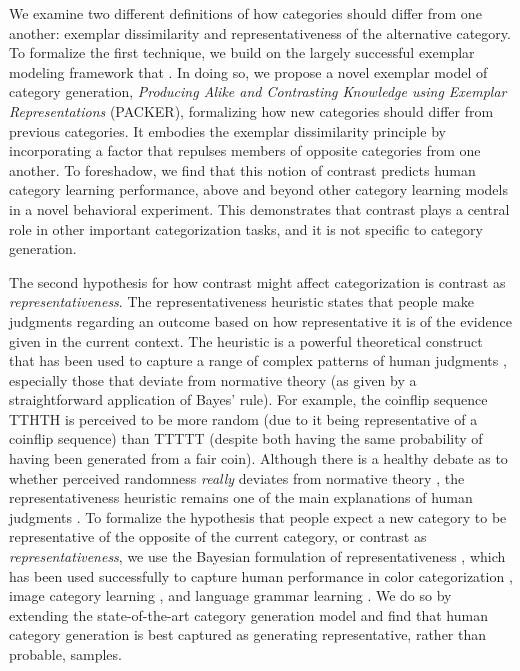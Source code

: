 \documentclass[12pt]{article}
\begin{document}
\begin{flushleft}
We examine two different definitions of how categories should differ from one
another: exemplar dissimilarity and representativeness of the alternative
category. To formalize the first technique, we build on the largely successful
exemplar modeling framework that
\citep{medin1978context,nosofsky1984choice,nosofsky1986attention}. In doing so,
we propose a novel exemplar model of category generation, {\em Producing Alike
  and Contrasting Knowledge using Exemplar Representations} (PACKER),
formalizing how new categories should differ from previous categories. It
embodies the exemplar dissimilarity principle by incorporating a factor that
repulses members of opposite categories from one another. To foreshadow, we find
that this notion of contrast predicts human category learning performance, above
and beyond other category learning models in a novel behavioral experiment. This
demonstrates that contrast plays a central role in other important
categorization tasks, and it is not specific to category generation.

The second hypothesis for how contrast might affect categorization is contrast
as {\em representativeness}. The representativeness heuristic \citep{kahneman1972subjective}
states that people make judgments regarding an outcome based on how
representative it is of the evidence given in the current context. The heuristic
is a powerful theoretical construct that has been used to capture a range of
complex patterns of human judgments \citep{kahneman73,tversky74,tversky83},
especially those that deviate from normative theory (as given by a
straightforward application of Bayes' rule). For example, the coinflip sequence
TTHTH is perceived to be more random (due to it being representative of a
coinflip sequence) than TTTTT (despite both having the same probability of
having been generated from a fair coin). Although there is a healthy debate as
to whether perceived randomness {\em really} deviates from normative theory
\citep{griffiths18,hahn09}, the representativeness heuristic remains one of the
main explanations of human judgments \citep{reimers18}. To formalize the
hypothesis that people expect a new category to be representative of the
opposite of the current category, or contrast as {\em representativeness}, we
use the Bayesian formulation of representativeness \citep{tenenbaum01}, which
has been used successfully to capture human performance in color categorization
\citep{abbott16}, image category learning \citep{abbott11}, and language grammar
learning \citep{rafferty10}. We do so by extending the state-of-the-art category
generation model \citep{jern2013probabilistic} and find that human category
generation is best captured as generating representative, rather than probable,
samples.


\end{flushleft}
\end{document}
